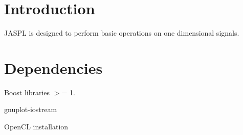 \hypertarget{index_intro_sec}{}\section{Introduction}\label{index_intro_sec}
J\+A\+S\+PL is designed to perform basic operations on one dimensional signals.\hypertarget{index_Dependencies}{}\section{Dependencies}\label{index_Dependencies}
\begin{DoxyItemize}
\item Boost libraries $>$= 1. \item gnuplot-\/iostream \item Open\+CL installation \end{DoxyItemize}
